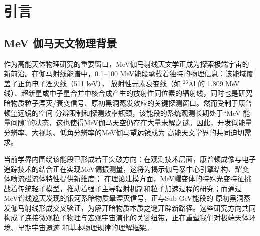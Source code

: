 \chapter{引言}
\label{chap:introduction}
\section{MeV 伽马天文物理背景}
\label{sec:meaning}

作为高能天体物理研究的重要窗口，MeV伽马射线天文学正成为探索极端宇宙的新前沿。在伽马射线能谱中，0.1--100 MeV能段承载着独特的物理信息：该能域覆盖了正负电子湮灭线（511 keV），
放射性元素衰变线（如 $^{26}$Al 的 1.809 MeV 线）、超新星或中子星合并中核合成产生的放射性同位素的辐射线，同时也是研究暗物质粒子湮灭/衰变信号、原初黑洞蒸发效应的关键探测窗口。然而受制于康普顿望远镜的空间
分辨限制和探测效率瓶颈，该能段的系统观测长期处于“MeV 能量间隙”的状态，这也使得MeV伽马天空仍存在大量未解之谜。因此，开发低能量分辨率、大视场、低角分辨率的MeV伽马望远镜成为
高能天文学界的共同迫切需求。\par
当前学界内围绕该能段已形成若干突破方向：在观测技术层面，康普顿成像与电子追踪技术的结合正在实现MeV偏振测量，这将为揭示伽马暴中心引擎结构、耀变体喷流磁流体特性提供新维度；
在理论建模方面，MeV耀变体的特殊光变特征挑战着传统轻子模型，推动着强子主导辐射机制和粒子加速过程的研究；而通过MeV谱线巡天发现的银河系暗物质晕湮灭信号，正与Sub-GeV能段的
原初黑洞蒸发伽马射线形成交叉验证，为解开暗物质本质之谜开辟新路径。这些研究方向共同构成了连接微观粒子物理与宏观宇宙演化的关键纽带，正在重塑我们对极端天体环境、早期宇宙遗迹
和基本物理规律的理解框架。\par
